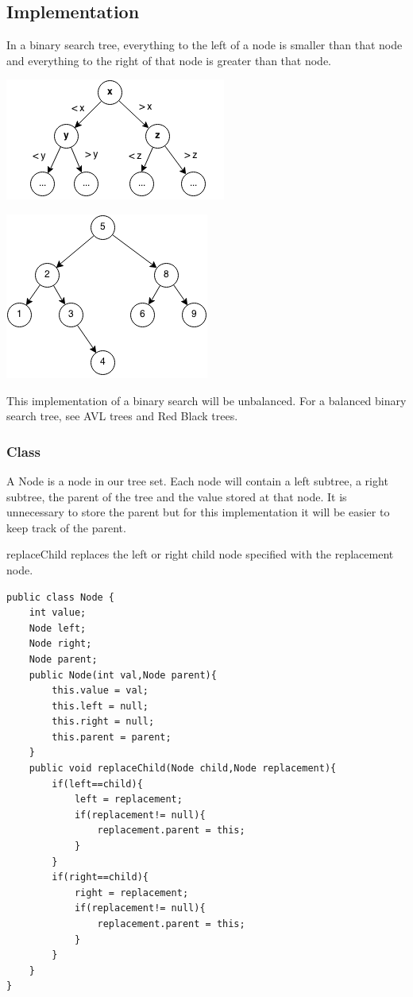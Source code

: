 \documentclass[11pt,oneside]{book}
\makeatletter
\def\maxwidth#1{\ifdim\Gin@nat@width>#1 #1\else\Gin@nat@width\fi}
\makeatother
\begin{document}
\subsection{Implementation}

In a binary search tree, everything to the left of a node is smaller than that node and everything to the right of that node is greater than that node.

\includegraphics[width=\maxwidth{\textwidth}]{bstcompare.png}

\includegraphics[width=\maxwidth{\textwidth}]{bst.png}

This implementation of a binary search will be unbalanced. For a balanced binary search tree, see AVL trees and Red Black trees.

\subsubsection{Class}

A Node is a node in our tree set. Each node will contain a left subtree, a right subtree, the parent of the tree and the value stored at that node. It is unnecessary to store the parent but for this implementation it will be easier to keep track of the parent.

replaceChild replaces the left or right child node specified with the replacement node.

\begin{lstlisting}
public class Node {
    int value;
    Node left;
    Node right;
    Node parent;
    public Node(int val,Node parent){
        this.value = val;
        this.left = null;
        this.right = null;
        this.parent = parent;
    }
    public void replaceChild(Node child,Node replacement){
        if(left==child){
            left = replacement;
            if(replacement!= null){
                replacement.parent = this;
            }
        }
        if(right==child){
            right = replacement;
            if(replacement!= null){
                replacement.parent = this;
            }
        }
    }
}
\end{lstlisting}
\end{document}
